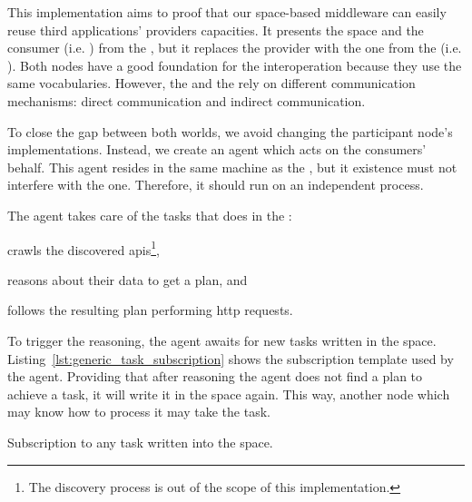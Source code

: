 This implementation aims to proof that our space-based middleware can easily reuse third applications' providers capacities. %
It presents the space and the consumer (i.e. \nodeConsSpace{}) from the \implSpace{}, but it replaces the provider with the one from the \implRest{} (i.e. \nodeProvRest{}).
Both nodes have a good foundation for the interoperation because they use the same vocabularies. %
However, the \nodeProvRest{} and the \nodeConsSpace{} rely on different communication mechanisms: direct communication and indirect communication.


To close the gap between both worlds, we avoid changing the participant node's implementations.
Instead, we create an agent which acts on the consumers' behalf. %
This agent resides in the same machine as the \Space{}, but it existence must not interfere with the \Space{} one. %
Therefore, it should run on an independent process.


The agent takes care of the tasks that \nodeConsRest{} does in the \implRest:
\begin{enumerate*}[label=\itshape(\arabic*\upshape)]
  \item crawls the discovered \acsp{api}\footnote{The discovery process is out of the scope of this implementation.},
  \item reasons about their data to get a plan, and
  \item follows the resulting plan performing \acs{http} requests.
\end{enumerate*}


To trigger the reasoning, the agent awaits for new tasks written in the space.
Listing~\ref{lst:generic_task_subscription} shows the subscription template used by the agent.
Providing that after reasoning the agent does not find a plan to achieve a task, it will write it in the space again.
This way, another node which may know how to process it may take the task. %


\begin{listing}
  
  \caption{Subscription to any task written into the space.}
  \label{lst:generic_task_subscription}
\end{listing}


